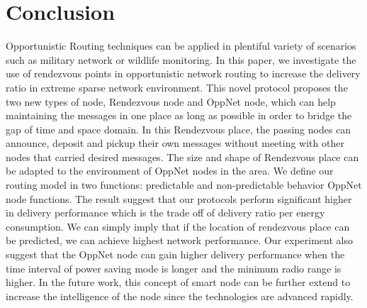 \section{Conclusion}
\label{DRRA:Conclusion}

Opportunistic Routing techniques can be applied in  plentiful variety of scenarios such as military network or wildlife monitoring. 
In this paper, we investigate the use of rendezvous points in opportunistic network routing to increase the delivery ratio in extreme sparse network environment.
This novel protocol proposes the two new types of node, Rendezvous node and OppNet node, which can help maintaining the messages in one place as long as possible in order to bridge the gap of time and space domain.
In this Rendezvous place, the passing nodes can announce, deposit and pickup their own messages without meeting with other nodes that carried desired messages.
The size and shape of  Rendezvous place can be adapted to the environment of OppNet nodes in the area.
We define our routing model in two functions: predictable  and non-predictable behavior OppNet node functions.
The result suggest that our protocols perform significant higher in delivery performance which is the trade off of delivery ratio per energy consumption.
We can simply imply that if the location of rendezvous place can be predicted, we can achieve highest network performance.
Our experiment also suggest that the OppNet node can gain higher delivery performance when the time interval of power saving mode is longer and the minimum radio range is higher.
In the future work, this concept of smart node can be further extend to increase the intelligence of the node since the technologies are advanced rapidly.



